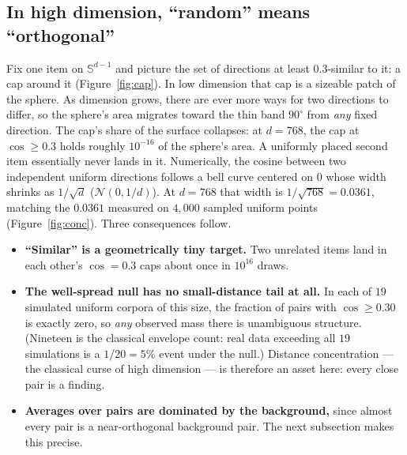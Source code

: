 \documentclass[11pt,letterpaper]{article}
\newcommand{\sphere}{\mathbb{S}^{d-1}}
\begin{document}
\subsection{In high dimension, ``random'' means ``orthogonal''}

Fix one item on $\sphere$ and picture the set of directions at least
$0.3$-similar to it: a cap around it (Figure~\ref{fig:cap}). In low
dimension that cap is a sizeable patch of the sphere. As dimension grows,
there are ever more ways for two directions to differ, so the sphere's
area migrates toward the thin band $90^\circ$ from \emph{any} fixed
direction. The cap's share of the surface collapses: at $d = 768$, the cap
at $\cos \ge 0.3$ holds roughly $10^{-16}$ of the sphere's area. A
uniformly placed second item essentially never lands in it. Numerically,
the cosine between two independent uniform directions follows a bell curve
centered on $0$ whose width shrinks as $1/\sqrt d$ ($\mathcal N(0, 1/d)$).
At $d = 768$ that width is $1/\sqrt{768} = 0.0361$, matching the $0.0361$
measured on $4{,}000$ sampled uniform points (Figure~\ref{fig:conc}).
Three consequences follow.
\begin{itemize}
\item \textbf{``Similar'' is a geometrically tiny target.} Two unrelated
  items land in each other's $\cos = 0.3$ caps about once in $10^{16}$
  draws.
\item \textbf{The well-spread null has no small-distance tail at all.}
  In each of $19$ simulated uniform corpora of this size, the fraction
  of pairs with $\cos \ge 0.30$ is exactly zero, so \emph{any} observed
  mass there is unambiguous structure. (Nineteen is the classical
  envelope count: real data exceeding all $19$ simulations is a
  $1/20 = 5\%$ event under the null.) Distance concentration --- the
  classical curse of high dimension \cite{beyer1999} --- is therefore an
  asset here: every close pair is a finding.
\item \textbf{Averages over pairs are dominated by the background,}
  since almost every pair is a near-orthogonal background pair. The next
  subsection makes this precise.
\end{itemize}
\end{document}
